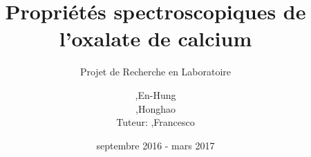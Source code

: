 \title{Propriétés spectroscopiques de l'oxalate de calcium}
\subtitle{Projet de Recherche en Laboratoire}
\author{\begin{tabularx}{\textwidth}{RL}
    ,& En-Hung\\
    ,& Honghao\\
    Tuteur: ,& Francesco
  \end{tabularx}
}
\date{septembre 2016 - mars 2017}

